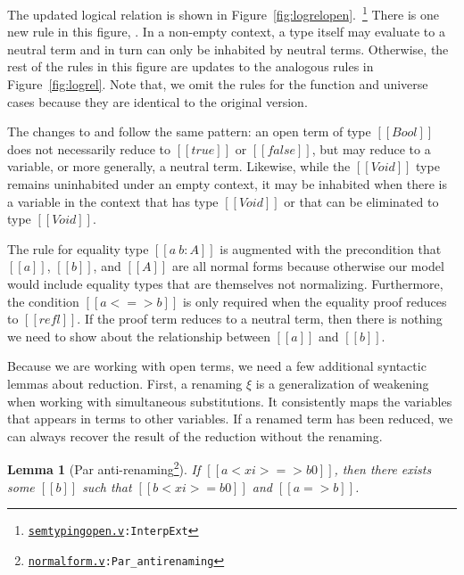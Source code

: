 \documentclass[\ifpublic nolinenum\else\fi,online,OA]{jfp}
\newcommand{\scw}[1]{}
\newcommand{\yl}[1]{}
\newcommand{\dotv}[2]{\href{#1}{\texttt{#1}}{\texttt{:#2}}}
\newtheorem{lemma}[theorem]{Lemma}
\theoremstyle{definition}
\begin{document}
The updated logical relation is shown in
Figure~\ref{fig:logrelopen}.~\footnote{\dotv{semtypingopen.v}{InterpExt}}
There is one new rule in this figure, . In a non-empty context, a
type itself may evaluate to a neutral term and in turn can only be inhabited
by neutral terms.  Otherwise, the rest of the rules in this figure are updates
to the analogous rules in Figure~\ref{fig:logrel}. Note that, we omit the
rules for the function and universe cases because they are identical to the
original version.

The changes to  and 
follow the same pattern: an open term of type $[[Bool]]$ does not necessarily
reduce to $[[true]]$ or $[[false]]$, but may reduce to a variable, or more
generally, a neutral term. Likewise, while the $[[Void]]$ type remains
uninhabited under an empty context, it may be inhabited when there is a
variable in the context that has type $[[Void]]$ or that can be eliminated to
type $[[Void]]$.

\scw{Cassia didn't understand this part}
The rule for equality type $[[a ~ b : A]]$ is augmented with the precondition that
$[[a]]$, $[[b]]$, and $[[A]]$ are all normal forms because
otherwise our model would include equality types that are themselves
not normalizing.
Furthermore, the condition $[[a <=> b]]$ is only
required when the equality proof reduces to $[[refl]]$. If the proof
term reduces to a neutral term, then there is nothing we need to show
about the relationship between $[[a]]$ and $[[b]]$.

Because we are working with open terms, we need a few additional syntactic
lemmas about reduction. First, a renaming $\xi$ is a generalization of
weakening when working with simultaneous substitutions. It consistently maps the
variables that appears in terms to other variables. If a renamed term has been reduced, we can
always recover the result of the reduction without the renaming.
%
\scw{This lemma is only used to prove \texttt{wn\_antirenaming}, which is then
used more generally. Maybe we should replace it with
that?}\yl{Anti-renaming is mentioned once in Section 6 when we talk abou how confluence with $\eta$
depends on anti-renaming for Par. I don't think that discussion in
Section 6 is very important so I'm fine with replacing it  }
\begin{lemma}[Par anti-renaming\footnote{\dotv{normalform.v}{Par\_antirenaming}}]
  \label{lemma:parantirenaming} If $[[a < xi > => b0]]$, then there
exists some $[[b]]$ such that $[[b < xi > = b0]]$ and $[[a => b]]$.
\end{lemma}
\end{document}
